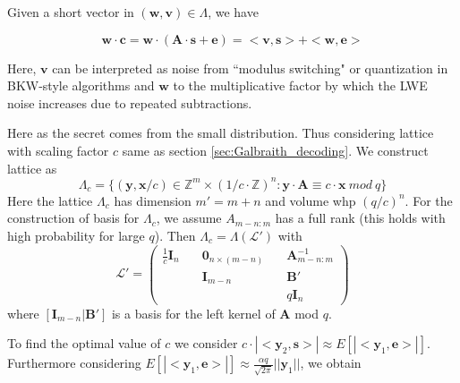 Given a short vector in $(\pmb{w},\pmb{v}) \in \Lambda$, we have

\begin{equation*}
    \pmb{w} \cdot \pmb{c} = \pmb{w} \cdot (\pmb{A} \cdot \pmb{s} + \pmb{e}) = <\pmb{v}, \pmb{s}> + <\pmb{w}, \pmb{e}>
\end{equation*}

Here, $\pmb{v}$ can be interpreted as noise from ``modulus switching" or quantization in BKW-style algorithms and $\pmb{w}$ to the multiplicative factor by which the LWE noise increases due to repeated subtractions.


Here as the secret comes from the small distribution. Thus considering lattice with scaling factor $c$ same as section \ref{sec:Galbraith_decoding}. We construct lattice as
\begin{equation*}
    \Lambda_c = \{(\pmb{y}, \pmb{x}/c) \in \mathbb{Z}^{m} \times (1/c \cdot \mathbb{Z})^n: \pmb{y} \cdot \pmb{A} \equiv c\cdot \pmb{x} \ mod\ q \}
\end{equation*}
Here the lattice $\Lambda_c$ has dimension $m' = m + n$ and volume whp $(q/c)^n$. For the construction of basis for $\Lambda_c$, we assume $A_{m-n:m}$ has a full rank (this holds with high probability for large $q$). Then $\Lambda_c = \Lambda(\mathcal{L}')$ with
\begin{equation*}
    \mathcal{L}'=
    \begin{pmatrix}
        \frac{1}{c}\pmb{I}_n \hspace{1em} & \pmb{0}_{n\times(m-n)} \hspace{1em} & \pmb{A}^{-1}_{m-n:m} \\
                                          & \pmb{I}_{m-n}                       & \pmb{B}'             \\
                                          &                                     & q\pmb{I}_n
    \end{pmatrix}
\end{equation*}
where $[\pmb{I}_{m-n}|\pmb{B}']$ is a basis for the left kernel of $\pmb{A}$ mod $q$.

To find the optimal value of $c$ we consider $c\cdot|<\pmb{y}_2, \pmb{s}>| \approx E[|<\pmb{y}_1, \pmb{e}>|]$. Furthermore considering $E[|<\pmb{y}_1, \pmb{e}>|] \approx \frac{\alpha q}{\sqrt{2\pi}} ||\pmb{y}_1||$, we obtain

